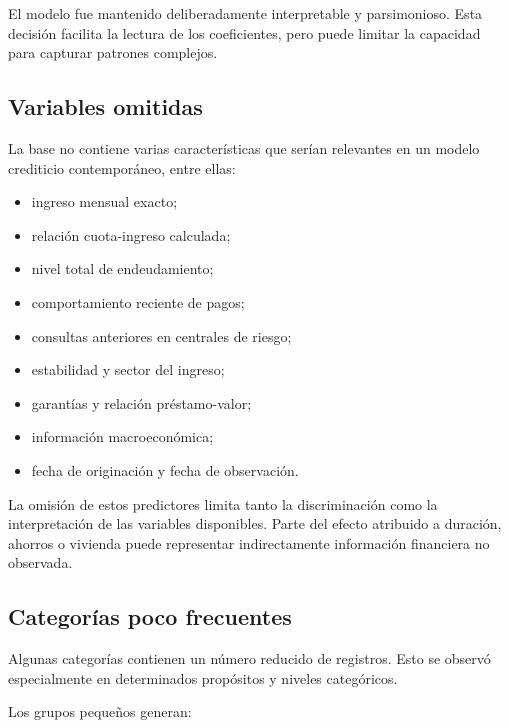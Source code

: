 El modelo fue mantenido deliberadamente interpretable y parsimonioso.
Esta decisión facilita la lectura de los coeficientes, pero puede limitar
la capacidad para capturar patrones complejos.

\subsection{Variables omitidas}

La base no contiene varias características que serían relevantes en un
modelo crediticio contemporáneo, entre ellas:

\begin{itemize}
    \item ingreso mensual exacto;

    \item relación cuota-ingreso calculada;

    \item nivel total de endeudamiento;

    \item comportamiento reciente de pagos;

    \item consultas anteriores en centrales de riesgo;

    \item estabilidad y sector del ingreso;

    \item garantías y relación préstamo-valor;

    \item información macroeconómica;

    \item fecha de originación y fecha de observación.
\end{itemize}

La omisión de estos predictores limita tanto la discriminación como la
interpretación de las variables disponibles. Parte del efecto atribuido
a duración, ahorros o vivienda puede representar indirectamente
información financiera no observada.

\subsection{Categorías poco frecuentes}

Algunas categorías contienen un número reducido de registros. Esto se
observó especialmente en determinados propósitos y niveles categóricos.

Los grupos pequeños generan:

